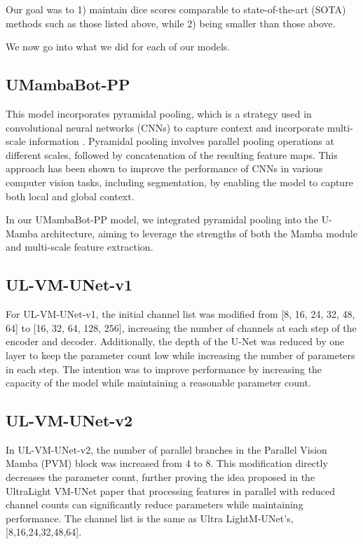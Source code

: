 \documentclass[conference]{IEEEtran}
\begin{document}
Our goal was to 1) maintain dice scores comparable to state-of-the-art (SOTA) methods such as those listed above, while 2) being smaller than those above.

We now go into what we did for each of our models.


\subsection{UMambaBot-PP}

This model incorporates pyramidal pooling, which is a strategy used in convolutional neural networks (CNNs) to capture context and incorporate multi-scale information \cite{zhao2017pyramid}. Pyramidal pooling involves parallel pooling operations at different scales, followed by concatenation of the resulting feature maps. This approach has been shown to improve the performance of CNNs in various computer vision tasks, including segmentation, by enabling the model to capture both local and global context.

In our UMambaBot-PP model, we integrated pyramidal pooling into the U-Mamba architecture, aiming to leverage the strengths of both the Mamba module and multi-scale feature extraction.


\subsection{UL-VM-UNet-v1}
For UL-VM-UNet-v1, the initial channel list was modified from [8, 16, 24, 32, 48, 64] to [16, 32, 64, 128, 256], increasing the number of channels at each step of the encoder and decoder. Additionally, the depth of the U-Net was reduced by one layer to keep the parameter count low while increasing the number of parameters in each step. The intention was to improve performance by increasing the capacity of the model while maintaining a reasonable parameter count.

\subsection{UL-VM-UNet-v2}
In UL-VM-UNet-v2, the number of parallel branches in the Parallel Vision Mamba (PVM) block was increased from 4 to 8. This modification directly decreases the parameter count, further proving the idea proposed in the UltraLight VM-UNet paper \cite{ultralightvmunet} that processing features in parallel with reduced channel counts can significantly reduce parameters while maintaining performance. The channel list is the same as Ultra LightM-UNet's, [8,16,24,32,48,64].
\end{document}
